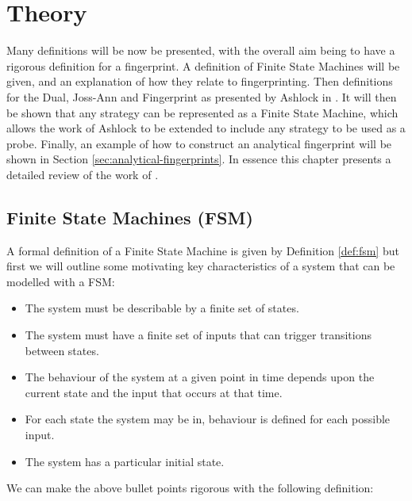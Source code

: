
\chapter{Theory}\label{cha:theory}

Many definitions will be now be presented, with the overall aim being to have a rigorous definition for a fingerprint.
A definition of Finite State Machines will be given, and an explanation of how they relate to fingerprinting.
Then definitions for the Dual, Joss-Ann and Fingerprint as presented by Ashlock in \cite{Ashlock2004}.
It will then be shown that any strategy can be represented as a Finite State Machine, which allows the work of Ashlock to be extended to include any strategy to be used as a probe.
Finally, an example of how to construct an analytical fingerprint will be shown in Section \ref{sec:analytical-fingerprints}.
In essence this chapter presents a detailed review of the work of \cite{Ashlock2008, Ashlock2010, Ashlock2004,  Ashlock2005, Ashlock2009, Ashlock2006,}.




\section{Finite State Machines (FSM)}\label{sec:fsm}

A formal definition of a Finite State Machine is given by Definition \ref{def:fsm} but first we will outline some motivating key characteristics of a system that can be modelled with a FSM:

\begin{itemize}
 \item The system must be describable by a finite set of states.
 \item The system must have a finite set of inputs that can trigger transitions between states.
 \item The behaviour of the system at a given point in time depends upon the current state and the input that occurs at that time.
 \item For each state the system may be in, behaviour is defined for each possible input.
 \item The system has a particular initial state.
\end{itemize}

We can make the above bullet points rigorous with the following definition:

